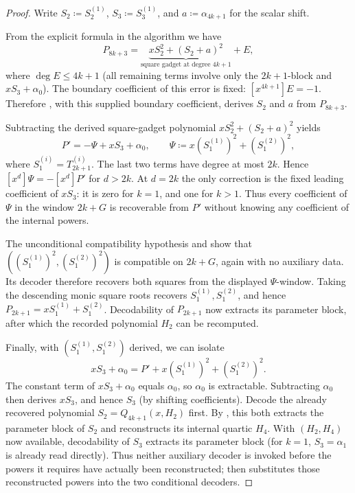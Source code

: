 \begin{proof}
    Write $S_2\coloneqq S^{(1)}_2$, $S_3\coloneqq S^{(1)}_3$, and $a\coloneqq \alpha_{4k+1}$ for the scalar shift.

    From the explicit formula in the algorithm we have
    \[
        P_{8k+3} = \underbrace{xS_2^2 + (S_2+a)^2}_{\text{square gadget at degree }4k+1} + E,
    \]
    where $\deg E\le 4k+1$ (all remaining terms involve only the $2k+1$-block and $xS_3+\alpha_0$).
    The boundary coefficient of this error is fixed:
    $[x^{4k+1}]E=-1$.  Therefore
    , with this supplied boundary
    coefficient, derives $S_2$ and $a$ from $P_{8k+3}$.

    Subtracting the derived square-gadget polynomial
    $xS_2^2+(S_2+a)^2$ yields
    \[
      P'=-\Psi+xS_3+\alpha_0,
      \qquad
      \Psi\coloneqq x(S^{(1)}_1)^2+(S^{(2)}_1)^2,
    \]
    where $S^{(i)}_1=T^{(i)}_{2k+1}$.  The last two terms have degree at
    most $2k$.  Hence $[x^d]\Psi=-[x^d]P'$ for $d>2k$.  At $d=2k$ the
    only correction is the fixed leading coefficient of $xS_3$: it is zero
    for $k=1$, and one for $k>1$.  Thus every coefficient of $\Psi$ in the
    window $2k+G$ is recoverable from $P'$ without knowing any coefficient of
    the internal powers.

    The unconditional compatibility hypothesis and
     show that
    $((S^{(1)}_1)^2,(S^{(2)}_1)^2)$ is compatible on $2k+G$, again with no
    auxiliary data.  Its decoder therefore recovers both squares from the
    displayed $\Psi$-window.  Taking the descending monic square roots
    recovers $S^{(1)}_1,S^{(2)}_1$, and hence
    $P_{2k+1}=xS^{(1)}_1+S^{(2)}_1$.  Decodability of $P_{2k+1}$ now extracts
    its parameter block, after which the recorded polynomial $H_2$ can be
    recomputed.

    Finally, with $(S^{(1)}_1,S^{(2)}_1)$ derived, we can isolate
    \[
        xS_3+\alpha_0 = P' + x(S^{(1)}_1)^2 + (S^{(2)}_1)^2.
    \]
    The constant term of $xS_3+\alpha_0$ equals $\alpha_0$, so $\alpha_0$ is extractable.
    Subtracting $\alpha_0$ then derives $xS_3$, and hence $S_3$ (by shifting coefficients).
    Decode the already recovered polynomial
    $S_2=Q_{4k+1}(x,H_2)$ first.  By
    , this both extracts the parameter block of $S_2$
    and reconstructs its internal quartic $H_4$.  With $(H_2,H_4)$ now
    available, decodability of $S_3$ extracts its parameter block (for $k=1$,
    $S_3=\alpha_1$ is already read directly).  Thus neither auxiliary decoder
    is invoked before the powers it requires have actually been reconstructed;
     then substitutes those reconstructed
    powers into the two conditional decoders.


\end{proof}
